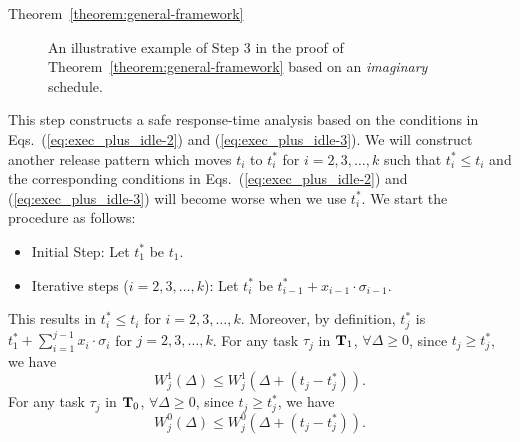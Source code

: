 \begin{appProof}{Theorem~\ref{theorem:general-framework}}
\begin{figure*}[t]

\caption{An illustrative example of Step 3 in the proof of Theorem~\ref{theorem:general-framework} based on an \emph{imaginary} schedule.}
\label{fig:example-proof-final}  
\end{figure*}

This step constructs a safe response-time analysis based on the
conditions in Eqs.~(\ref{eq:exec_plus_idle-2}) and
(\ref{eq:exec_plus_idle-3}). We will construct another release pattern
which moves $t_i$ to $t_i^*$ for $i=2,3,\ldots,k$ such that $t_i^*
\leq t_i$ and the corresponding conditions in Eqs.~(\ref{eq:exec_plus_idle-2}) and
(\ref{eq:exec_plus_idle-3}) will become worse when we use $t_i^*$. We start
the procedure as follows:
\begin{itemize}
\item Initial Step: Let $t_1^*$ be $t_1$.
\item Iterative steps ($i=2,3,\ldots,k$): Let $t_i^*$ be $t_{i-1}^*+x_{i-1}\cdot\sigma_{i-1}$.
\end{itemize}
This results in $t_i^* \leq t_i$ for $i=2,3,\ldots,k$. Moreover, by
definition, $t_j^*$ is $t_1^* + \sum_{i=1}^{j-1} x_i\cdot\sigma_i$ for
$j=2,3,\ldots,k$.
For any task $\tau_j$ in ${\bf T}_1$,  $\forall \Delta \geq 0$, since $t_j \geq t_j^*$, we have
\begin{equation}
  \label{eq:execution-case1-shifted}
  W_j^1(\Delta)  \leq W_j^1(\Delta + (t_j-t_j^*)).
\end{equation}
For any task $\tau_j$ in ${\bf T}_0$,  $\forall \Delta \geq 0$, since $t_j \geq t_j^*$, we have
\begin{equation}
  \label{eq:execution-case2-shifted}
  W_j^0(\Delta)  \leq W_j^0(\Delta + (t_j-t_j^*)).
\end{equation}


\end{appProof}
